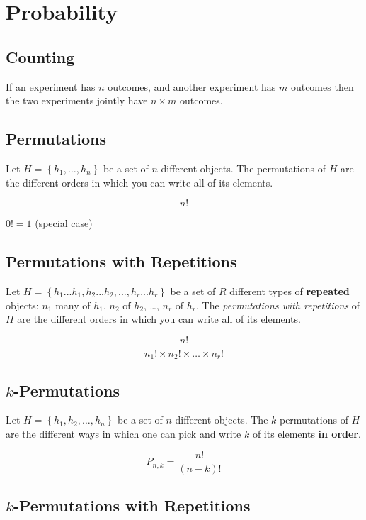 \section{Probability}

\subsection{Counting}

If an experiment has $n$ outcomes, and another experiment has $m$ outcomes then the two experiments jointly have $n\times m$ outcomes.

\subsection{Permutations}

Let $H = \left\{h_1, \dots, h_n\right\}$ be a set of $n$ different objects. The permutations of $H$ are the different orders in which you can write all of its elements.

$$ n! $$

$ 0! = 1 $ (special case)

\subsection{Permutations with Repetitions}

Let $H = \left\{h_1...h_1,h_2...h_2,...,h_r...h_r \right\}$ be a set of $R$ different types of \textbf{repeated} objects: $n_1$ many of $h_1$, $n_2$ of $h_2$, \dots, $n_r$ of $h_r$. The \textit{permutations with repetitions} of $H$ are the different orders in which you can write all of its elements.

$$ \frac{n!}{n_1! \times n_2! \times \ldots \times n_r!} $$

\subsection{$k$-Permutations}

Let $H = \left\{h_1, h_2, \dots, h_n\right\}$ be a set of $n$ different objects. The $k$-permutations of $H$ are the different ways in which one can pick and write $k$ of its elements \textbf{in order}.

$$ P_{n,k} = \frac{n!}{(n-k)!} $$

\subsection{$k$-Permutations with Repetitions}

